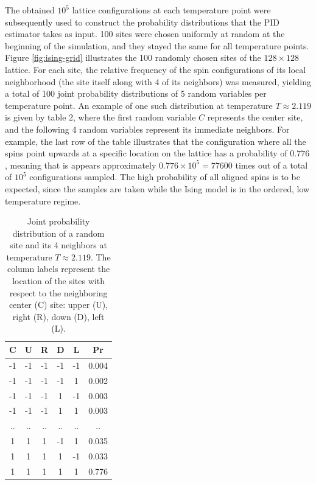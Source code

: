 \documentclass[12pt]{article}
\begin{document}
The obtained $10^5$ lattice configurations at each temperature  point were subsequently used to construct the probability distributions that the PID estimator takes as input. 100 sites were chosen uniformly at random at the beginning of the simulation, and they stayed the same for all temperature points. Figure \ref{fig:ising-grid} illustrates the 100 randomly chosen sites of the $128\times128$ lattice. For each site, the relative frequency of the spin configurations of its local neighborhood (the site itself along with 4 of its neighbors) was measured, yielding a total of 100 joint probability distributions of 5 random variables per temperature point. An example of one such distribution at temperature $T \approx 2.119$ is given by table 2, where the first random variable $C$ represents the center site, and the following 4 random variables represent its immediate neighbors. For example, the last row of the table illustrates that the configuration where all the spins point upwards at a specific location on the lattice has a probability of $0.776$, meaning that is appears approximately $0.776 \times 10^5 = 77 600$ times out of a total of $10^5$ configurations sampled. The high probability of all aligned spins is to be expected, since the samples are taken while the Ising model is in the ordered, low temperature regime.

\begin{table}[h!]
\centering
\caption{Joint probability distribution of a random site and its 4 neighbors at temperature $T \approx 2.119$. The column labels represent the location of the sites with respect to the neighboring center (C) site: upper (U), right (R), down (D), left (L).}
\begin{tabular}{c c c c c c}
	\hline
	C & U & R & D & L & Pr\\ 
	\hline
	-1 & -1 & -1 & -1 & -1 & 0.004 \\
	-1 & -1 & -1 & -1 & 1 & 0.002 \\
	-1 & -1 & -1 & 1 & -1 & 0.003 \\
	-1 & -1 & -1 & 1 & 1 & 0.003 \\
	.. & .. & .. &  .. & .. & .. \\
	1 & 1 & 1 & -1 & 1 & 0.035 \\
 	1 & 1 & 1 & 1 & -1 & 0.033 \\
 	1 & 1 & 1 & 1 & 1 & 0.776 \\
 	\hline
\end{tabular}
\label{table:4}
\end{table}
\end{document}
